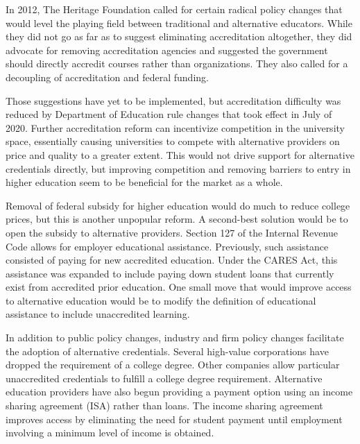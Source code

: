 \documentclass[review]{elsarticle}
\begin{document}
In 2012, The Heritage Foundation called for certain radical policy changes that would level the playing field between traditional and alternative educators.
While they did not go as far as to suggest eliminating accreditation altogether,
they did advocate for removing accreditation agencies and suggested the government should directly accredit courses rather than organizations. %
They also called for a decoupling of accreditation and federal funding.

Those suggestions have yet to be implemented, but accreditation difficulty was reduced by Department of Education rule changes that
took effect in July of 2020. %
Further accreditation reform can incentivize competition in the university space,
essentially causing universities to compete with alternative providers on price and quality to a greater extent.
This would not drive support for alternative credentials directly, but improving competition and removing
barriers to entry in higher education seem to be beneficial for the market as a whole.


Removal of federal subsidy for higher education would do much to reduce college prices, but this is another unpopular reform.
A second-best solution would be to open the subsidy to alternative providers.
Section 127 of the Internal Revenue Code allows for employer educational assistance.
Previously, such assistance consisted of paying for new accredited education.
Under the CARES Act,
this assistance was expanded to include paying down student loans that currently exist from accredited prior education.
One small move that would improve access to alternative education
would be to modify the definition of educational assistance to include unaccredited learning.

In addition to public policy changes, industry and firm policy changes facilitate the adoption of alternative credentials.
Several high-value corporations have dropped the requirement of a college degree. %
Other companies allow particular unaccredited credentials to fulfill a college degree requirement. %
Alternative education providers have also begun providing a payment option using an income sharing agreement (ISA) rather than loans.
The income sharing agreement improves access by eliminating the need for student payment until employment involving a minimum level of income is obtained.
\end{document}
